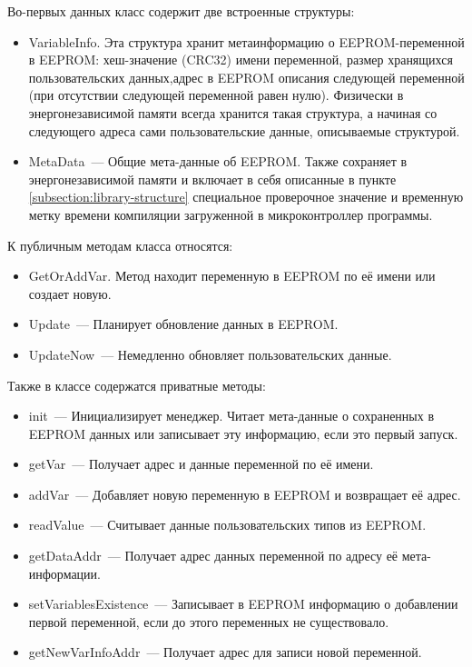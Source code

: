 Во-первых данных класс содержит две встроенные структуры:

\begin{itemize}
	\item VariableInfo. Эта структура хранит метаинформацию о EEPROM-переменной в EEPROM: хеш-значение (CRC32) имени переменной, размер хранящихся пользовательских данных,адрес в EEPROM описания следующей переменной (при отсутствии следующей переменной равен нулю).
	Физически в энергонезависимой памяти всегда хранится такая структура, а начиная со следующего адреса сами пользовательские данные, описываемые структурой.

	\item MetaData~--- Общие мета-данные об EEPROM.
	Также сохраняет в энергонезависимой памяти и включает в себя описанные в пункте \ref{subsection:library-structure} специальное проверочное значение и временную метку времени компиляции загруженной в микроконтроллер программы.
\end{itemize}

К публичным методам класса относятся:
\begin{itemize}
	\item GetOrAddVar. Метод находит переменную в EEPROM по её имени или создает новую.
	\item Update~--- Планирует обновление данных в EEPROM.
	\item UpdateNow~--- Немедленно обновляет пользовательских данные.
\end{itemize}

Также в классе содержатся приватные методы:

\begin{itemize}
	\item init~--- Инициализирует менеджер. Читает мета-данные о сохраненных в EEPROM данных или записывает эту информацию, если это первый запуск.
	\item getVar~--- Получает адрес и данные переменной по её имени.
	\item addVar~--- Добавляет новую переменную в EEPROM и возвращает её адрес.
	\item readValue~--- Считывает данные пользовательских типов из EEPROM.
	\item getDataAddr~--- Получает адрес данных переменной по адресу её мета-информации.
	\item setVariablesExistence~--- Записывает в EEPROM информацию о добавлении первой переменной, если до этого переменных не существовало.
	\item getNewVarInfoAddr~--- Получает адрес для записи новой переменной.
\end{itemize}

